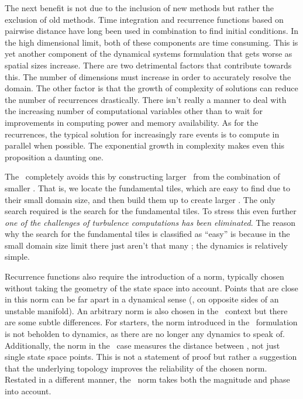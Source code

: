 The next benefit is not due to the inclusion of new methods but
rather the exclusion of old methods. Time integration and
recurrence functions based on pairwise distance have long been used in combination
to find initial conditions. %
In the high dimensional limit, both
of these components are time consuming. This is yet another
component of the dynamical systems formulation that gets worse
as spatial sizes increase. There are two detrimental factors
that contribute towards this. The number of dimensions must increase
in order to accurately resolve the domain. The other factor is that
the growth of complexity of solutions can reduce the number of recurrences
drastically. There isn't really a manner to deal with the increasing
number of computational variables other than to wait for improvements
in computing power and memory availability. As for the recurrences, the
typical solution for increasingly rare events is to compute in parallel when
possible. The exponential growth in complexity makes even this proposition
a daunting one.

The \spt\ completely avoids this by constructing larger \twots\
from the combination of smaller \twots. That is,
we locate the fundamental tiles, which are easy to find due to their small
domain size, and then build them up to create larger \twots. The only
search required is the search for the fundamental tiles. To stress
this even further \textit{one of the challenges of turbulence
computations has been eliminated}. The reason
why the search for the fundamental tiles is classified as ``easy'' is because
in the small domain size limit there just aren't that many \twots; the dynamics
is relatively simple.

Recurrence functions also require the introduction of a norm,
typically chosen without taking the geometry of the state space into account.
Points that are close in this norm can be far apart in a dynamical sense (\ie, on opposite sides
of an unstable manifold). An arbitrary norm is also chosen in the \spt\
context but there are some subtle differences. For starters, the
norm introduced in the \spt\ formulation is not beholden to dynamics, as
there are no longer any dynamics to speak of.
Additionally, the norm in the \spt\ case measures the distance between \twots,
not just single state space points. This is not a statement of proof but rather
a suggestion that the underlying topology improves the reliability of
the chosen norm. Restated in a different manner, the \spt\ norm
takes both the magnitude and phase into account.

